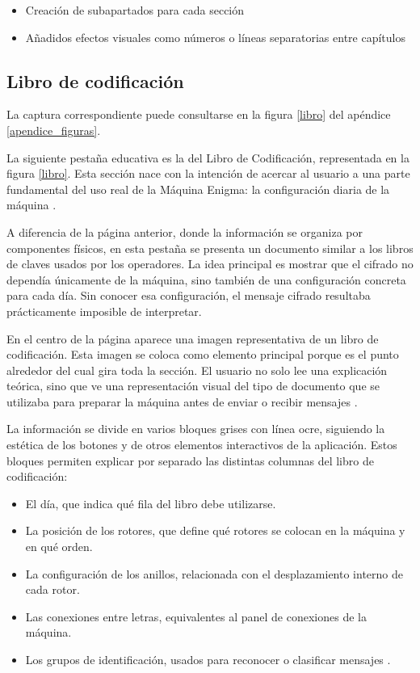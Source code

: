 \begin{itemize}
	\item Creación de subapartados para cada sección
	\item Añadidos efectos visuales como números o líneas separatorias entre capítulos 
\end{itemize}


\subsection{Libro de codificación}

La captura correspondiente puede consultarse en la figura \ref{libro} del apéndice \ref{apendice_figuras}.

La siguiente pestaña educativa es la del Libro de Codificación, representada en la figura \ref{libro}. Esta sección nace con la intención de acercar al usuario a una parte fundamental del uso real de la Máquina Enigma: la configuración diaria de la máquina \cite{operation_turing_codebook}.

A diferencia de la página anterior, donde la información se organiza por componentes físicos, en esta pestaña se presenta un documento similar a los libros de claves usados por los operadores. La idea principal es mostrar que el cifrado no dependía únicamente de la máquina, sino también de una configuración concreta para cada día. Sin conocer esa configuración, el mensaje cifrado resultaba prácticamente imposible de interpretar.

En el centro de la página aparece una imagen representativa de un libro de codificación. Esta imagen se coloca como elemento principal porque es el punto alrededor del cual gira toda la sección. El usuario no solo lee una explicación teórica, sino que ve una representación visual del tipo de documento que se utilizaba para preparar la máquina antes de enviar o recibir mensajes \cite{operation_turing_codebook}.

La información se divide en varios bloques grises con línea ocre, siguiendo la estética de los botones y de otros elementos interactivos de la aplicación. Estos bloques permiten explicar por separado las distintas columnas del libro de codificación:

\begin{itemize}
	\item El día, que indica qué fila del libro debe utilizarse.
	\item La posición de los rotores, que define qué rotores se colocan en la máquina y en qué orden.
	\item La configuración de los anillos, relacionada con el desplazamiento interno de cada rotor.
	\item Las conexiones entre letras, equivalentes al panel de conexiones de la máquina.
	\item Los grupos de identificación, usados para reconocer o clasificar mensajes \cite{operation_turing_codebook}.
\end{itemize}

